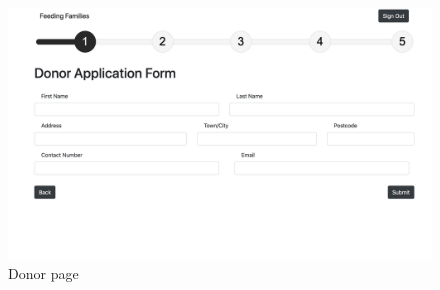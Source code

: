 \documentclass[12pt]{article}
\begin{document}
\begin{figure}[h]
    \centering
    \hspace*{-2cm}\includegraphics[scale=0.4]{main/donor.png}
    \caption{Donor page}
    \label{fig6}
\end{figure}
\end{document}
